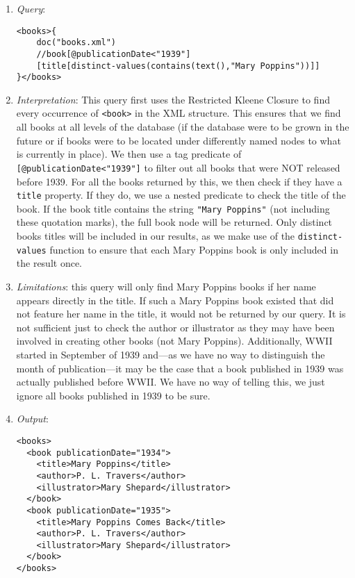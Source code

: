 \documentclass[11pt]{article}
\begin{document}
\begin{enumerate}
\item \textit{Query}:
\begin{small}
\begin{verbatim}
<books>{
    doc("books.xml")
    //book[@publicationDate<"1939"]
    [title[distinct-values(contains(text(),"Mary Poppins"))]]
}</books>
\end{verbatim}
\end{small}
\item \textit{Interpretation}: This query first uses the Restricted Kleene Closure to find every occurrence of \texttt{<book>} in the XML structure. This ensures that we find all books at all levels of the database (if the database were to be grown in the future or if books were to be located under differently named nodes to what is currently in place). We then use a tag predicate of \texttt{[@publicationDate<"1939"]} to filter out all books that were NOT released before 1939. For all the books returned by this, we then check if they have a \texttt{title} property. If they do, we use a nested predicate to check the title of the book. If the book title contains the string \texttt{"Mary Poppins"} (not including these quotation marks), the full book node will be returned. Only distinct books titles will be included in our results, as we make use of the \texttt{distinct-values} function to ensure that each Mary Poppins book is only included in the result once.

\item \textit{Limitations}: this query will only find Mary Poppins books if her name appears directly in the title. If such a Mary Poppins book existed that did not feature her name in the title, it would not be returned by our query. It is not sufficient just to check the author or illustrator as they may have been involved in creating other books (not Mary Poppins). Additionally, WWII started in September of 1939 and---as we have no way to distinguish the month of publication---it may be the case that a book published in 1939 was actually published before WWII. We have no way of telling this, we just ignore all books published in 1939 to be sure.
\item \textit{Output}:
\begin{verbatim}
<books>
  <book publicationDate="1934">
    <title>Mary Poppins</title>
    <author>P. L. Travers</author>
    <illustrator>Mary Shepard</illustrator>
  </book>
  <book publicationDate="1935">
    <title>Mary Poppins Comes Back</title>
    <author>P. L. Travers</author>
    <illustrator>Mary Shepard</illustrator>
  </book>
</books>
\end{verbatim} 
\end{enumerate}
\end{document}
